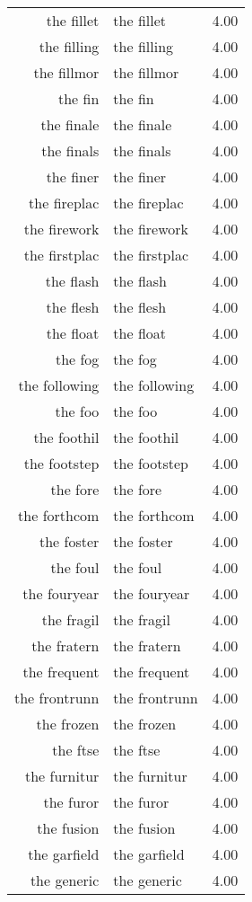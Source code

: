\begin{table}[ht]
\begin{tabular}{rlr}
  the fillet & the fillet & 4.00 \\ 
  the filling & the filling & 4.00 \\ 
  the fillmor & the fillmor & 4.00 \\ 
  the fin & the fin & 4.00 \\ 
  the finale & the finale & 4.00 \\ 
  the finals & the finals & 4.00 \\ 
  the finer & the finer & 4.00 \\ 
  the fireplac & the fireplac & 4.00 \\ 
  the firework & the firework & 4.00 \\ 
  the firstplac & the firstplac & 4.00 \\ 
  the flash & the flash & 4.00 \\ 
  the flesh & the flesh & 4.00 \\ 
  the float & the float & 4.00 \\ 
  the fog & the fog & 4.00 \\ 
  the following & the following & 4.00 \\ 
  the foo & the foo & 4.00 \\ 
  the foothil & the foothil & 4.00 \\ 
  the footstep & the footstep & 4.00 \\ 
  the fore & the fore & 4.00 \\ 
  the forthcom & the forthcom & 4.00 \\ 
  the foster & the foster & 4.00 \\ 
  the foul & the foul & 4.00 \\ 
  the fouryear & the fouryear & 4.00 \\ 
  the fragil & the fragil & 4.00 \\ 
  the fratern & the fratern & 4.00 \\ 
  the frequent & the frequent & 4.00 \\ 
  the frontrunn & the frontrunn & 4.00 \\ 
  the frozen & the frozen & 4.00 \\ 
  the ftse & the ftse & 4.00 \\ 
  the furnitur & the furnitur & 4.00 \\ 
  the furor & the furor & 4.00 \\ 
  the fusion & the fusion & 4.00 \\ 
  the garfield & the garfield & 4.00 \\ 
  the generic & the generic & 4.00 \\ 

\end{tabular}
\end{table}
